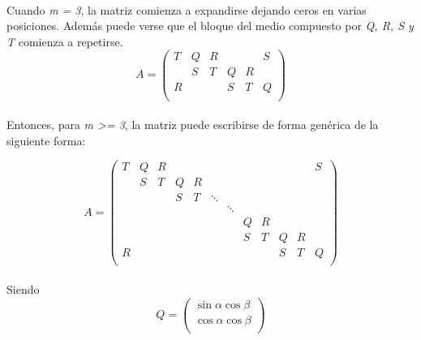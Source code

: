 \documentclass[a4paper,11pt]{article}
\begin{document}
\paragraph{}
Cuando \emph{m = 3}, la matriz comienza a expandirse dejando ceros en varias
posiciones. Adem\'as puede verse que el bloque del medio compuesto por \emph{Q,
R, S y T} comienza a repetirse.
\begin{equation} \label{matrizM3}
A =
\left( \begin{array}{cccccc}
T & Q & R & & & S\\
 & S & T & Q & R & \\
R & & & S & T & Q\\
\end{array} \right)
\end{equation}
\paragraph{}
Entonces, para \emph{m \textgreater = 3}, la matriz puede escribirse de forma
gen\'erica de la siguiente forma:

\begin{equation} \label{matrizM4}
A =
\left( \begin{array}{cccccccccccc}
T & Q & R &   &   &  &  &  &  &  &  & S\\
  & S & T & Q & R &  &  &  &  &  &  &  \\
  &   &   & S & T & \ddots&  &  &  &  &  &  \\
  &   &   &   &   &  & \ddots&  &  &  &  &  \\
  &   &   &   &   &  &  & Q & R &  &  &  \\
  &   &   &   &   &  &  & S & T & Q & R &  \\
R &   &   &   &   &  &  &   &   & S & T & Q\\
\end{array} \right)
\end{equation}
\paragraph{}
Siendo
\begin{equation} \label{matrizQ}
Q =
\left( \begin{array}{cccc}
\sin \alpha \cos \beta\\
\cos \alpha \cos \beta\\
\end{array} \right)
\end{equation}
\end{document}
